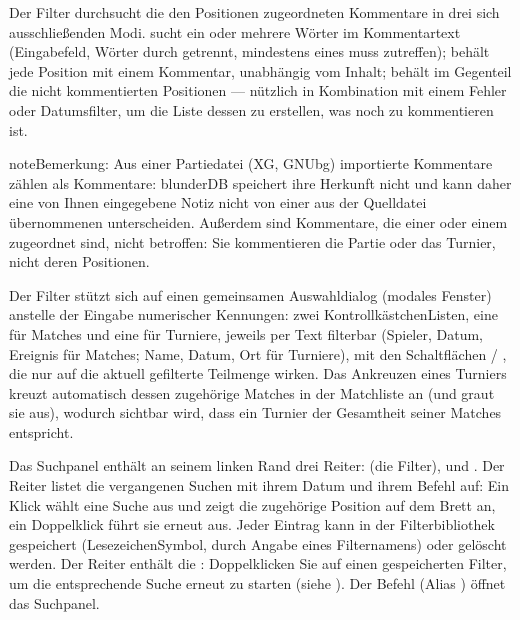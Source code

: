 \documentclass[letterpaper,10pt,german]{sphinxmanual}
\begin{document}
\sphinxAtStartPar
Der Filter  durchsucht die den Positionen zugeordneten Kommentare in drei sich ausschließenden Modi.  sucht ein oder mehrere Wörter im Kommentartext (Eingabefeld, Wörter durch \sphinxcode{\sphinxupquote{;}} getrennt, mindestens eines muss zutreffen);  behält jede Position mit einem Kommentar, unabhängig vom Inhalt;  behält im Gegenteil die nicht kommentierten Positionen — nützlich in Kombination mit einem Fehler\sphinxhyphen{} oder Datumsfilter, um die Liste dessen zu erstellen, was noch zu kommentieren ist.

\begin{sphinxadmonition}{note}{Bemerkung:}
\sphinxAtStartPar
Aus einer Partiedatei (XG, GNUbg) importierte Kommentare zählen als Kommentare: blunderDB speichert ihre Herkunft nicht und kann daher eine von Ihnen eingegebene Notiz nicht von einer aus der Quelldatei übernommenen unterscheiden. Außerdem sind Kommentare, die einer  oder einem  zugeordnet sind, nicht betroffen: Sie kommentieren die Partie oder das Turnier, nicht deren Positionen.
\end{sphinxadmonition}

\sphinxAtStartPar
Der Filter  stützt sich auf einen gemeinsamen Auswahldialog (modales Fenster) anstelle der Eingabe numerischer Kennungen: zwei Kontrollkästchen\sphinxhyphen{}Listen, eine für Matches und eine für Turniere, jeweils per Text filterbar (Spieler, Datum, Ereignis für Matches; Name, Datum, Ort für Turniere), mit den Schaltflächen  / , die nur auf die aktuell gefilterte Teilmenge wirken. Das Ankreuzen eines Turniers kreuzt automatisch dessen zugehörige Matches in der Matchliste an (und graut sie aus), wodurch sichtbar wird, dass ein Turnier der Gesamtheit seiner Matches entspricht.

\sphinxAtStartPar
Das Suchpanel enthält an seinem linken Rand drei Reiter:  (die Filter),  und . Der Reiter  listet die vergangenen Suchen mit ihrem Datum und ihrem Befehl auf: Ein Klick wählt eine Suche aus und zeigt die zugehörige Position auf dem Brett an, ein Doppelklick führt sie erneut aus. Jeder Eintrag kann in der Filterbibliothek gespeichert (Lesezeichen\sphinxhyphen{}Symbol, durch Angabe eines Filternamens) oder gelöscht werden. Der Reiter  enthält die : Doppelklicken Sie auf einen gespeicherten Filter, um die entsprechende Suche erneut zu starten (siehe {\hyperref[\detokenize{annexe_filtres:annexe-filtres}]{}}). Der Befehl  (Alias ) öffnet das Suchpanel.
\end{document}
